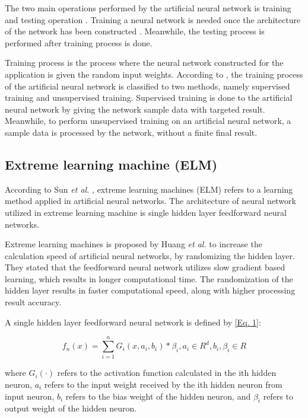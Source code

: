 \documentclass[journal,comsoc]{IEEEtran}
\begin{document}
The two main operations performed by the artificial neural network is training and testing operation \cite{Uhrig95}. Training a neural network is needed once the architecture of the network has been constructed \cite{Reingnold16}. Meanwhile, the testing process is performed after training process is done.

Training process is the process where the neural network constructed for the application is given the random input weights. According to \cite{Heeswijk15}, the training process of the artificial neural network is classified to two methods, namely supervised training and unsupervised training. Supervised training is done to the artificial neural network by giving the network sample data with targeted result. Meanwhile, to perform unsupervised training on an artificial neural network, a sample data is processed by the network, without a finite final result.

\subsection{Extreme learning machine (ELM)}

According to Sun \textit{et al.} \cite{Gao14}, extreme learning machines (ELM) refers to a learning method applied in artificial neural networks. The architecture of neural network utilized in extreme learning machine is single hidden layer feedforward neural networks.

Extreme learning machines is proposed by Huang \textit{et al.} \cite{Huang06} to increase the calculation speed of artificial neural networks, by randomizing the hidden layer. They stated that the feedforward neural network utilizes slow gradient based learning, which results in longer computational time. The randomization of the hidden layer results in faster computational speed, along with higher processing result accuracy.

A single hidden layer feedforward neural network is defined by \eqref{Eq. 1}:

\begin{equation}
f_{n} (x) = \sum_{i=1}^{n} G_{i} (x, a_{i}, b_{i}) * \beta_{i}, a_{i} \in R^d, b_{i}, \beta_{i} \in R\label{Eq. 1}
\end{equation}

where $G_{i}(\cdot)$ refers to the activation function calculated in the ith hidden neuron, $a_{i}$ refers to the input weight received by the ith hidden neuron from input neuron, $b_{i}$ refers to the bias weight of the hidden neuron, and $\beta_{i}$ refers to output weight of the hidden neuron.
\end{document}
